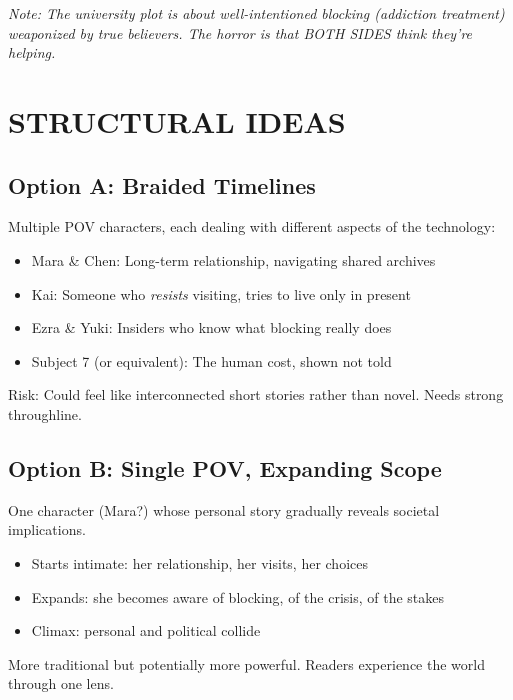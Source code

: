 \documentclass[11pt,letterpaper]{article}
\begin{document}
\textit{Note: The university plot is about well-intentioned blocking (addiction treatment) weaponized by true believers. The horror is that BOTH SIDES think they're helping.}

\vspace{1em}

\section*{STRUCTURAL IDEAS}

\subsection*{Option A: Braided Timelines}

Multiple POV characters, each dealing with different aspects of the technology:

\begin{itemize}
    \item Mara \& Chen: Long-term relationship, navigating shared archives
    \item Kai: Someone who \textit{resists} visiting, tries to live only in present
    \item Ezra \& Yuki: Insiders who know what blocking really does
    \item Subject 7 (or equivalent): The human cost, shown not told
\end{itemize}

\textcolor{warnorange}{Risk: Could feel like interconnected short stories rather than novel. Needs strong throughline.}

\subsection*{Option B: Single POV, Expanding Scope}

One character (Mara?) whose personal story gradually reveals societal implications.

\begin{itemize}
    \item Starts intimate: her relationship, her visits, her choices
    \item Expands: she becomes aware of blocking, of the crisis, of the stakes
    \item Climax: personal and political collide
\end{itemize}

\textcolor{ideagreen}{More traditional but potentially more powerful. Readers experience the world through one lens.}
\end{document}
